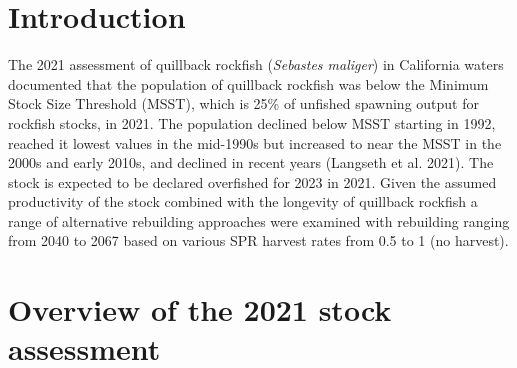 \documentclass[11pt,
  english,
  a4paper,
]{article}
\begin{document}
\leavevmode\tagmcend\tagstructend\par

\pagebreak
\setlength{\parskip}{5mm plus1mm minus1mm}
\setcounter{page}{1}
\renewcommand{\thefigure}{\arabic{figure}}
\renewcommand{\thetable}{\arabic{table}}
\setcounter{table}{0}
\setcounter{figure}{0}

\setlength\parskip{0.2em plus 0.1em minus 0.2em}


\hypertarget{introduction}{%
\section{Introduction}\label{introduction}}

\leavevmode\tagmcend\tagstructend


The 2021 assessment of quillback rockfish (\emph{Sebastes maliger}) in California waters documented that the population of quillback rockfish was below the Minimum Stock Size Threshold (MSST), which is 25\% of unfished spawning output for rockfish stocks, in 2021. The population declined below MSST starting in 1992, reached it lowest values in the mid-1990s but increased to near the MSST in the 2000s and early 2010s, and declined in recent years {(Langseth et al. 2021)\leavevmode\tagmcend\tagstructend}. The stock is expected to be declared overfished for 2023 in 2021. Given the assumed productivity of the stock combined with the longevity of quillback rockfish a range of alternative rebuilding approaches were examined with rebuilding ranging from 2040 to 2067 based on various SPR harvest rates from 0.5 to 1 (no harvest).

\leavevmode\tagmcend\tagstructend\par


\hypertarget{overview-of-the-2021-stock-assessment}{%
\section{Overview of the 2021 stock assessment}\label{overview-of-the-2021-stock-assessment}}

\leavevmode\tagmcend\tagstructend

\end{document}
